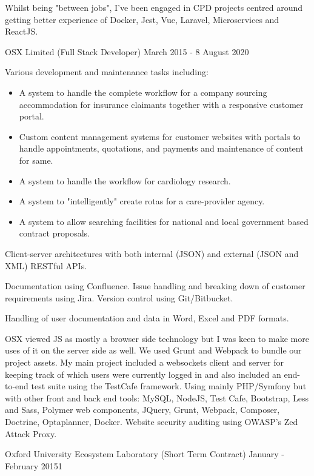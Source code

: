 Whilst being "between jobs", I've been engaged in CPD projects centred around
getting better experience of Docker, Jest, Vue, Laravel, Microservices and
ReactJS.

\jobHeading
    {OSX Limited (Full Stack Developer)}
    {March 2015 - 8 August 2020}

Various development and maintenance tasks including:
\begin{itemize}
    \item A system to handle the complete workflow for a company sourcing accommodation for insurance claimants together with a responsive customer portal.
    \item Custom content management systems for customer websites with portals to handle appointments, quotations, and payments and maintenance of content for same.
    \item A system to handle the workflow for cardiology research.
    \item A system to "intelligently" create rotas for a care-provider agency.
    \item A system to allow searching facilities for national and local government based contract proposals.
\end{itemize}

Client-server architectures with both
internal (JSON) and external (JSON and XML) RESTful APIs.

Documentation using Confluence. Issue handling and breaking down
of customer requirements using Jira. Version control using Git/Bitbucket.

Handling of user documentation and data in Word, Excel and PDF formats.


\ifnum{}
    OSX viewed JS as mostly a browser side technology
    but I was keen to make more uses of it on the server side as well.
    We used Grunt and Webpack to bundle our project assets.
    My main project included a websockets client and server
    for keeping track of which users were currently logged in
    and also included an end-to-end test suite
    using the TestCafe framework.
\else
    Using mainly PHP/Symfony but with other front and back end tools:
    MySQL, NodeJS, Test Cafe, Bootstrap, Less and Sass,
    Polymer web components, JQuery, Grunt, Webpack, Composer,
    Doctrine, Optaplanner, Docker.
    Website security auditing using OWASP's Zed Attack Proxy.
\fi

\jobHeading
    {Oxford University Ecosystem Laboratory (Short Term Contract)}
    {January - February 20151}

